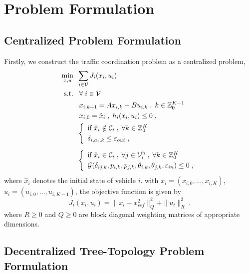 \documentclass[letterpaper, 10 pt, conference]{ieeeconf}
\begin{document}
\section{Problem Formulation}
\label{sec::form}

\subsection{Centralized Problem Formulation}
Firstly, we construct the traffic coordination problem as a centralized problem,
\begin{subequations}\label{eq::prob}
	\begin{align}
	\min_{x,u}\;\;& \sum_{i\in \mathcal{V}}  J_i(x_i,u_i)\\\notag
	\text{s.t.}\;\;&\;\forall \;i\in \mathcal{V}\\\label{eq::cons1}
	&\; x_{i,k+1} = Ax_{i,k}+Bu_{i,k}\;,\;
	k\in\mathbb{Z}_0^{K-1}\\\label{eq::cons2}
	&\;x_{i,0} = \hat{x}_i\;,\;h_i(x_i,u_i)\leq 0\;,\\\label{eq::cons3}
	&\left\{
	\begin{array}{l}\text{if }\hat{x}_i\notin \mathcal{C}_i
	\;,\;\forall k\in\mathbb{Z}_0^{K} \\[0.1cm]
	\delta_{i,a_i,k} \leq \varepsilon_{out}\;,
	\end{array}
	\right.\\[0.16cm]\label{eq::cons4}
	&\left\{
	\begin{array}{l}
	\text{if } \hat{x}_i \in \mathcal{C}_i\;,\;\forall j\in\mathcal{V}_i^\mathrm{b}\;,\;\forall k\in\mathbb{Z}_0^{K}  \\[0.1cm]	\mathcal{G}(\delta_{ij,k},p_{i,k},p_{j,k},\theta_{i,k},\theta_{j,k},\varepsilon_{in})\leq 0\;, 
	\end{array}
	\right.
	\end{align}
\end{subequations}
where $\hat{x}_i$ denotes the initial state of vehicle $i$. with $x_i=(x_{i,0},\dots,x_{i,K})$, $u_i=(u_{i,0},\dots,u_{i,K-1})$, the objective function is given by
\begin{equation}
J_i(x_i,u_i)=\parallel x_{i}-x_{ref}^2 \parallel _{Q}^2 + \parallel u_i\parallel _{R}^2 \;.
\end{equation}
where $R\geq0$ and $Q\geq0$ are block diagonal weighting matrices of appropriate dimensions.

\subsection{Decentralized Tree-Topology Problem Formulation}
\end{document}
